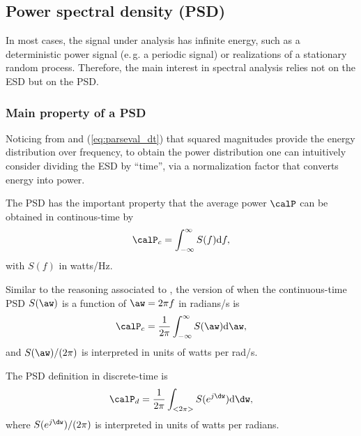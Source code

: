 \subsection{Power spectral density (PSD)}
\label{sec:psd}

In most cases, the signal under analysis has infinite energy, such as a deterministic power signal (e.\,g. a periodic signal) or realizations of a stationary random process. Therefore, the main interest in spectral analysis relies not on the ESD but on the PSD.

\subsubsection{Main property of a PSD}

Noticing from  and (\ref{eq:parseval_dt}) that squared magnitudes provide the energy distribution over frequency, to obtain the power distribution one can intuitively consider dividing the ESD by ``time'', via a normalization factor that converts energy into power.

The PSD 
has the important property that the average power $\calP$ can be obtained in continous-time by
\begin{equation}
\calP_c = \int_{- \infty}^\infty S(f) \textrm{d}f,
\label{eq:psd_integration_continuousTime}
\end{equation}
with $S(f)$ in watts/Hz.

Similar to the reasoning associated to , the version of  when the continuous-time PSD $S(\aw)$ is a function of $\aw = 2 \pi f$ in radians/s is
\begin{equation}
\calP_c = \frac{1}{2\pi} \int_{- \infty}^\infty S(\aw) \textrm{d}\aw,
\label{eq:psd_integration_continuousTime_rads}
\end{equation}
and $S(\aw)/(2 \pi)$ is interpreted in units of watts per rad/s.

The PSD definition in discrete-time is
\begin{equation}
\calP_d = \frac{1}{2 \pi}\int_{<2 \pi>} S(e^{j \dw}) \textrm{d}\dw,
\label{eq:psd_integration}
\end{equation}
where $S(e^{j \dw})/(2 \pi)$ is interpreted in units of watts per radians.


